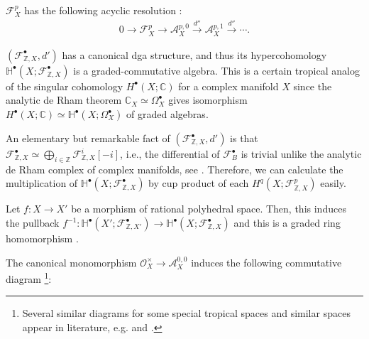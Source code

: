 \documentclass[a4paper,dvipdfmx,reqno,12pt]{amsart}
\theoremstyle{definition}
\newcommand{\C}{\mathbb{C}}%
\newcommand{\Z}{\mathbb{Z}}%
\newcommand{\mb}[1]{\mathbb{#1}}%
\newcommand{\mcal}[1]{\mathcal{#1}}%
\newcommand{\xto}[1]{\xrightarrow{#1}}
\newcommand{\myfootnote}[1]{\hspace{-5pt}\footnote{#1}}
\numberwithin{equation}{section}
\begin{document}
$\mcal{F}^{p}_{X}$ has the following acyclic resolution
\cite[Corollary 3.18, Lemma 3.21]{MR3903579}:
\begin{align}
  0 \to \mcal{F}^{p}_{X} \to \mcal{A}^{p,0}_{X}\xto{d''} 
\mcal{A}^{p,1}_{X} \xto{d''}\cdots.
\end{align}

$(\mathcal{F}_{\mathbb{Z},X}^{\bullet},d')$ has a canonical dga structure, 
and thus its hypercohomology 
$\mb{H}^{\bullet}(X;\mcal{F}_{\mathbb{Z},X}^{\bullet})$ is a 
graded-commutative algebra. 
This is a certain tropical analog of the singular cohomology
$H^{\bullet}(X;\C)$ for a complex manifold $X$ since 
the analytic de Rham theorem $\C_X \simeq \Omega_X^{\bullet}$ 
gives isomorphism 
$H^{\bullet}(X;\C)\simeq \mb{H}^{\bullet}(X;\Omega_X^{\bullet})$
of graded algebras. 

An elementary but remarkable fact of 
$(\mcal{F}_{\mathbb{Z},X}^{\bullet},d')$ is that 
$\mcal{F}_{\mathbb{Z},X}^{\bullet}\simeq 
\bigoplus_{i\in \Z}\mcal{F}_{\mathbb{Z},X}^{i}[-i]$, i.e., the differential 
of $\mcal{F}_{B}^{\bullet}$ is trivial unlike the analytic de Rham complex
of complex manifolds, see \cite[Corollary 2.15]{smacka2017differential}.
Therefore, we can calculate the multiplication of 
$\mb{H}^{\bullet}(X;\mcal{F}_{\mathbb{Z},X}^{\bullet})$ by 
cup product of each $H^{q}(X;\mcal{F}_{\mathbb{Z},X}^{p})$ easily.

Let $f\colon X\to X'$ be a morphism of rational polyhedral 
space. Then, this induces the pullback $f^{-1}\colon 
\mb{H}^{\bullet}(X';\mcal{F}_{\Z, X'}^{\bullet})\to 
\mb{H}^{\bullet}(X;\mcal{F}_{\Z, X}^{\bullet})$
and this is a graded ring homomorphism \cite[Proposition 4.17]{gross2019sheaftheoretic}. 

The canonical monomorphism $\mcal{O}^{\times}_X \to \mcal{A}^{0,0}_X$
induces the following commutative diagram 
\myfootnote{Several similar diagrams for some special tropical spaces 
and similar spaces appear
in literature, e.g. \cite[p.468]{MR2567952}
and \cite[Definition 1.45]{grossMirrorSymmetryLogarithmic2006a}.}:
\end{document}
